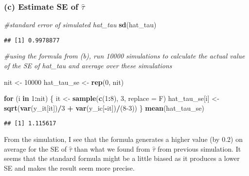 \documentclass[]{article}
\newenvironment{Shaded}{\begin{snugshade}}{\end{snugshade}}
\newcommand{\CommentTok}[1]{\textcolor[rgb]{0.56,0.35,0.01}{\textit{#1}}}
\newcommand{\ControlFlowTok}[1]{\textcolor[rgb]{0.13,0.29,0.53}{\textbf{#1}}}
\newcommand{\DataTypeTok}[1]{\textcolor[rgb]{0.13,0.29,0.53}{#1}}
\newcommand{\DecValTok}[1]{\textcolor[rgb]{0.00,0.00,0.81}{#1}}
\newcommand{\KeywordTok}[1]{\textcolor[rgb]{0.13,0.29,0.53}{\textbf{#1}}}
\newcommand{\NormalTok}[1]{#1}
\newcommand{\OperatorTok}[1]{\textcolor[rgb]{0.81,0.36,0.00}{\textbf{#1}}}
\newcommand{\StringTok}[1]{\textcolor[rgb]{0.31,0.60,0.02}{#1}}
\begin{document}
\hypertarget{c-estimate-se-of-hattau}{%
\subsubsection{\texorpdfstring{(c) Estimate SE of
\(\hat{\tau}\)}{(c) Estimate SE of \textbackslash{}hat\{\textbackslash{}tau\}}}\label{c-estimate-se-of-hattau}}

\begin{Shaded}
\begin{Highlighting}[]
\CommentTok{#standard error of simulated hat_tau}
\KeywordTok{sd}\NormalTok{(hat_tau)}
\end{Highlighting}
\end{Shaded}

\begin{verbatim}
## [1] 0.9978877
\end{verbatim}

\begin{Shaded}
\begin{Highlighting}[]
\CommentTok{#using the formula from (b), run 10000 simulations to calculate the actual value of the SE of hat_tau and average over these simulations}

\NormalTok{nit <-}\StringTok{ }\DecValTok{10000}
\NormalTok{hat_tau_se <-}\StringTok{ }\KeywordTok{rep}\NormalTok{(}\DecValTok{0}\NormalTok{, nit)}

\ControlFlowTok{for}\NormalTok{ (i }\ControlFlowTok{in} \DecValTok{1}\OperatorTok{:}\NormalTok{nit) \{}
\NormalTok{  it <-}\StringTok{ }\KeywordTok{sample}\NormalTok{(}\KeywordTok{c}\NormalTok{(}\DecValTok{1}\OperatorTok{:}\DecValTok{8}\NormalTok{), }\DecValTok{3}\NormalTok{, }\DataTypeTok{replace =}\NormalTok{ F)}
\NormalTok{  hat_tau_se[i] <-}\StringTok{ }\KeywordTok{sqrt}\NormalTok{(}\KeywordTok{var}\NormalTok{(y_it[it])}\OperatorTok{/}\DecValTok{3} \OperatorTok{+}\StringTok{ }\KeywordTok{var}\NormalTok{(y_ic[}\OperatorTok{-}\NormalTok{it])}\OperatorTok{/}\NormalTok{(}\DecValTok{8-3}\NormalTok{))}
\NormalTok{\}}
\KeywordTok{mean}\NormalTok{(hat_tau_se)}
\end{Highlighting}
\end{Shaded}

\begin{verbatim}
## [1] 1.115617
\end{verbatim}

From the simulation, I see that the formula generates a higher value (by
0.2) on average for the SE of \(\hat{\tau}\) than what we found from
\(\hat{\tau}\) from previous simulation. It seems that the standard
formula might be a little biased as it produces a lower SE and makes the
result seem more precise.
\end{document}
